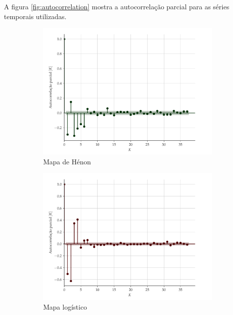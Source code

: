 \documentclass{article}
\begin{document}
A figura \ref{fig:autocorrelation} mostra a autocorrelação parcial para as séries temporais utilizadas.
\begin{figure}[H]
     \begin{subfigure}[t]{0.2\textwidth}
         \includegraphics[scale=0.2]{autocorrelacao-parcial-henon.pdf}
         \caption{Mapa de Hénon}
     \end{subfigure}
     \centering
     \begin{subfigure}[t]{0.2\textwidth} 
         \includegraphics[scale=0.2]{autocorrelacao-parcial-logistic.pdf}
         \caption{Mapa logístico}
     \end{subfigure}
     \centering
     \begin{subfigure}[t]{0.2\textwidth}

\end{subfigure}
\end{figure}
\end{document}
